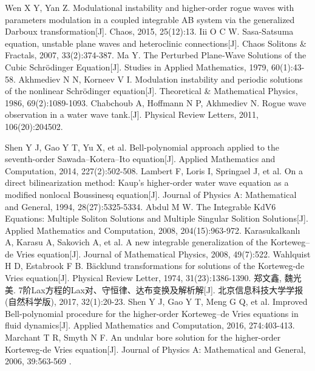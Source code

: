 \begin{thebibliography}{0}
Wen X Y, Yan Z. Modulational instability and higher-order rogue waves with parameters modulation in a coupled integrable AB system via the generalized Darboux transformation[J]. Chaos, 2015, 25(12):13.
 Iii O C W. Sasa-Satsuma equation, unstable plane waves and heteroclinic connections[J]. Chaos Solitons \& Fractals, 2007, 33(2):374-387.
 Ma Y. The Perturbed Plane‐Wave Solutions of the Cubic Schrödinger Equation[J]. Studies in Applied Mathematics, 1979, 60(1):43-58.
 Akhmediev N N, Korneev V I. Modulation instability and periodic solutions of the nonlinear Schrödinger equation[J]. Theoretical \& Mathematical Physics, 1986, 69(2):1089-1093.
 Chabchoub A, Hoffmann N P, Akhmediev N. Rogue wave observation in a water wave tank.[J]. Physical Review Letters, 2011, 106(20):204502.

 Shen Y J, Gao Y T, Yu X, et al. Bell-polynomial approach applied to the seventh-order Sawada–Kotera–Ito equation[J]. Applied Mathematics and Computation, 2014, 227(2):502-508.
 Lambert F, Loris I, Springael J, et al. On a direct bilinearization method: Kaup's higher-order water wave equation as a modified nonlocal Boussinesq equation[J]. Journal of Physics A: Mathematical and General, 1994, 28(27):5325-5334. 
 Abdul M W. The Integrable KdV6 Equations: Multiple Soliton Solutions and Multiple Singular Solition Solutions[J]. Applied Mathematics and Computation, 2008, 204(15):963-972.
 Karasukalkanlı A, Karasu A, Sakovich A, et al. A new integrable generalization of the Korteweg–de Vries equation[J]. Journal of Mathematical Physics, 2008, 49(7):522. 
 Wahlquist H D, Estabrook F B. Bäcklund transformations for solutions of the Korteweg-de Vries equation[J]. Physical  Review  Letter, 1974, 31(23):1386-1390.
 郑文鑫, 魏光美. 7阶Lax方程的Lax对、守恒律、达布变换及解析解[J]. 北京信息科技大学学报(自然科学版), 2017, 32(1):20-23.
 Shen Y J, Gao Y T, Meng G Q, et al. Improved Bell-polynomial procedure for the higher-order Korteweg–de Vries equations in fluid dynamics[J]. Applied Mathematics and Computation, 2016, 274:403-413.
 Marchant T R, Smyth N F. An undular bore solution for the higher-order Korteweg-de Vries equation[J]. Journal of Physics A: Mathematical and General, 2006, 39:563-569 .


\end{thebibliography}
\cleardoublepage
